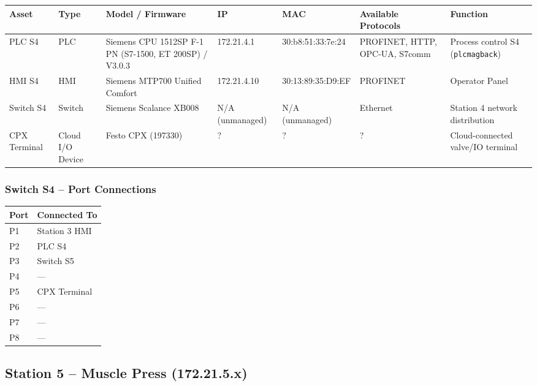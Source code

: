 \begin{adjustbox}{max width=\textwidth}
\begin{tabular}{lllllll}
\toprule
\textbf{Asset} & \textbf{Type} & \textbf{Model / Firmware} & \textbf{IP} & \textbf{MAC} & \textbf{Available Protocols} & \textbf{Function} \\
\midrule
PLC S4       & PLC              & Siemens CPU 1512SP F-1 PN (S7-1500, ET 200SP) / V3.0.3 & 172.21.4.1      & 30:b8:51:33:7e:24 & PROFINET, HTTP, OPC-UA, S7comm & Process control S4 (\texttt{plcmagback}) \\
HMI S4       & HMI              & Siemens MTP700 Unified Comfort & 172.21.4.10     & 30:13:89:35:D9:EF & PROFINET & Operator Panel \\
Switch S4    & Switch           & Siemens Scalance XB008         & N/A (unmanaged) & N/A (unmanaged)   & Ethernet & Station 4 network distribution \\
CPX Terminal & Cloud I/O Device & Festo CPX (197330)              & ?               & ?                 & ?        & Cloud-connected valve/IO terminal \\
\bottomrule
\end{tabular}
\end{adjustbox}

\subsubsection{Switch S4 – Port Connections}

\begin{tabular}{ll}
\toprule
\textbf{Port} & \textbf{Connected To} \\
\midrule
P1 & Station 3 HMI \\
P2 & PLC S4 \\
P3 & Switch S5 \\
P4 & — \\
P5 & CPX Terminal \\
P6 & — \\
P7 & — \\
P8 & — \\
\bottomrule
\end{tabular}

\subsection{Station 5 – Muscle Press (172.21.5.x)}

